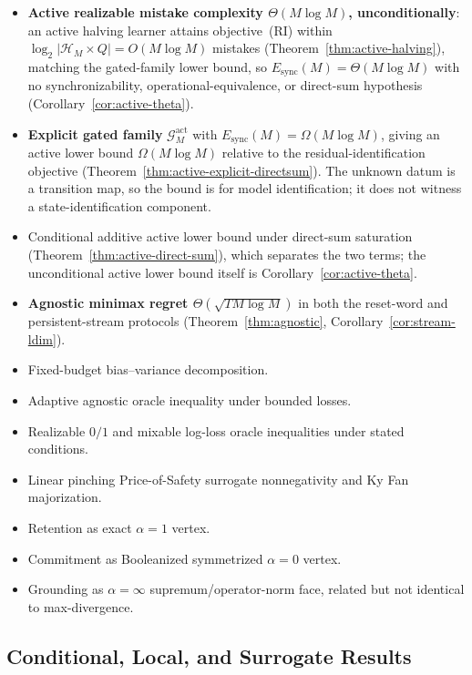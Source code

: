 \documentclass[12pt]{article}
\theoremstyle{definition}
\newcommand{\Esync}{E_{\mathrm{sync}}}
\newcommand{\Gact}{\mathcal G^{\mathrm{act}}}
\begin{document}
\begin{itemize}[leftmargin=1.6em]
\item \textbf{Active realizable mistake complexity
$\Theta(M\log M)$, unconditionally}: an active halving learner attains
objective~(RI) within $\log_2|\mathcal H_M\times Q|=O(M\log M)$ mistakes
(Theorem~\ref{thm:active-halving}), matching the gated-family lower bound, so
$\Esync(M)=\Theta(M\log M)$ with no synchronizability,
operational-equivalence, or direct-sum hypothesis
(Corollary~\ref{cor:active-theta}).
\item \textbf{Explicit gated family} $\Gact_M$ with
$\Esync(M)=\Omega(M\log M)$, giving an active lower bound
$\Omega(M\log M)$ relative to the residual-identification objective
(Theorem~\ref{thm:active-explicit-directsum}).  The unknown datum is a
transition map, so the bound is for model identification; it does not witness a
state-identification component.
\item Conditional additive active lower bound under direct-sum saturation
(Theorem~\ref{thm:active-direct-sum}), which separates the two terms; the
unconditional active lower bound itself is
Corollary~\ref{cor:active-theta}.
\item \textbf{Agnostic minimax regret $\Theta(\sqrt{T M\log M})$} in both the
reset-word and persistent-stream protocols
(Theorem~\ref{thm:agnostic}, Corollary~\ref{cor:stream-ldim}).
\item Fixed-budget bias--variance decomposition.
\item Adaptive agnostic oracle inequality under bounded losses.
\item Realizable $0/1$ and mixable log-loss oracle inequalities under stated
conditions.
\item Linear pinching Price-of-Safety surrogate nonnegativity and Ky Fan
majorization.
\item Retention as exact $\alpha=1$ vertex.
\item Commitment as Booleanized symmetrized $\alpha=0$ vertex.
\item Grounding as $\alpha=\infty$ supremum/operator-norm face, related but
not identical to max-divergence.
\end{itemize}

\subsection{Conditional, Local, and Surrogate Results}
\label{subsec:conditional-results}
\end{document}
